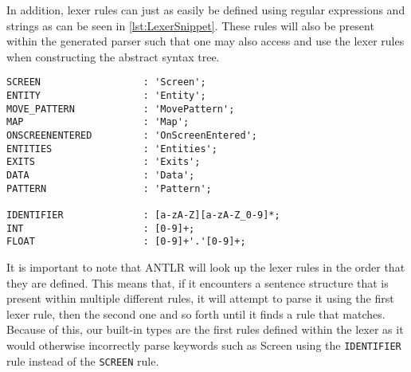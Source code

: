 In addition, lexer rules can just as easily be defined using regular expressions and strings as can be seen in \ref{lst:LexerSnippet}.
These rules will also be present within the generated parser such that one may also access and use the lexer rules when constructing the abstract syntax tree. 

\begin{lstlisting}[caption={A snippet of few lexer rules for \dazel{}.}, label={lst:LexerSnippet}]
SCREEN                  : 'Screen';
ENTITY                  : 'Entity';
MOVE_PATTERN            : 'MovePattern';
MAP                     : 'Map';
ONSCREENENTERED         : 'OnScreenEntered';
ENTITIES                : 'Entities';
EXITS                   : 'Exits';
DATA                    : 'Data';
PATTERN                 : 'Pattern';

IDENTIFIER              : [a-zA-Z][a-zA-Z_0-9]*;
INT                     : [0-9]+;
FLOAT                   : [0-9]+'.'[0-9]+;	
\end{lstlisting}

It is important to note that ANTLR will look up the lexer rules in the order that they are defined. 
This means that, if it encounters a sentence structure that is present within multiple different rules, it will attempt to parse it using the first lexer rule, then the second one and so forth until it finds a rule that matches. 
Because of this, our built-in types are the first rules defined within the lexer as it would otherwise incorrectly parse keywords such as Screen using the \texttt{IDENTIFIER} rule instead of the \texttt{SCREEN} rule\cite{parrDefinitiveANTLRReference2012}.
